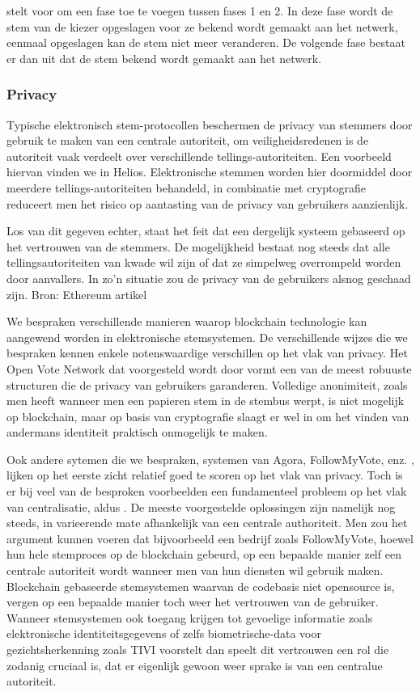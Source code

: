 			\textcite{McCorry2017} stelt voor om een fase toe te voegen tussen fases 1 en 2. In deze fase wordt de stem van de kiezer opgeslagen voor ze bekend wordt gemaakt aan het netwerk, eenmaal opgeslagen kan de stem niet meer veranderen. De volgende fase bestaat er dan uit dat de stem bekend wordt gemaakt aan het netwerk.
	\subsubsection{Privacy}
	Typische elektronisch stem-protocollen beschermen de privacy van stemmers door gebruik te maken van een centrale autoriteit, om veiligheidsredenen is de autoriteit vaak verdeelt over verschillende tellings-autoriteiten. Een voorbeeld hiervan vinden we in Helios. Elektronische stemmen worden hier doormiddel door meerdere tellings-autoriteiten behandeld, in combinatie met cryptografie reduceert men het risico op aantasting van de privacy van gebruikers aanzienlijk. 
	
	
	Los van dit gegeven echter, staat het feit dat een dergelijk systeem gebaseerd op het vertrouwen van de stemmers. De mogelijkheid bestaat nog steeds dat alle tellingsautoriteiten van kwade wil zijn of dat ze simpelweg overrompeld worden door aanvallers. In zo’n situatie zou de privacy van de gebruikers alsnog geschaad zijn.  Bron: Ethereum artikel
	
	We bespraken verschillende manieren waarop blockchain technologie kan aangewend worden in elektronische stemsystemen. De verschillende wijzes die we bespraken kennen enkele notenswaardige verschillen op het vlak van privacy. Het Open Vote Network dat voorgesteld wordt door \textcite{McCorry2017} vormt een van de meest robuuste structuren die de privacy van gebruikers garanderen. Volledige anonimiteit, zoals men heeft wanneer men een papieren stem in de stembus werpt, is niet mogelijk op blockchain, maar op basis van cryptografie slaagt \textcite{McCorry2017} er wel in om het vinden van andermans identiteit praktisch onmogelijk te maken. 
	
	Ook  andere sytemen die we bespraken, systemen van Agora, FollowMyVote, enz. , lijken op het eerste zicht  relatief goed te scoren op het vlak van privacy. Toch is er bij veel van de besproken voorbeelden een fundamenteel probleem op het vlak van centralisatie, aldus \textcite{McCorry2017}. De meeste voorgestelde oplossingen zijn namelijk nog steeds, in varieerende mate afhankelijk van een centrale authoriteit. Men zou het argument kunnen voeren dat bijvoorbeeld een bedrijf zoals FollowMyVote, hoewel hun hele stemproces op de blockchain gebeurd, op een bepaalde manier zelf een centrale autoriteit wordt wanneer men van hun diensten wil gebruik maken. Blockchain gebaseerde stemsystemen waarvan de codebasis  niet opensource is, vergen op een bepaalde manier toch weer het vertrouwen van de gebruiker. Wanneer stemsystemen ook toegang krijgen tot gevoelige informatie zoals elektronische identiteitsgegevens of zelfs biometrische-data voor gezichtsherkenning zoals TIVI voorstelt dan speelt dit vertrouwen een rol die zodanig cruciaal is, dat er eigenlijk gewoon weer sprake is van een centralue autoriteit.
	
